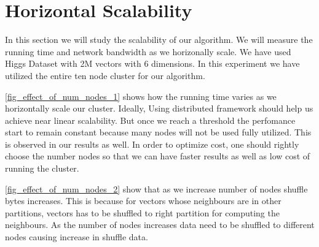 \section{Horizontal Scalability}
In this section we will study the scalability of our algorithm. We
will measure the running time and network bandwidth as we horizonally
scale.
We have used Higgs Dataset with 2M vectors with 6 dimensions. In this experiment we
have utilized the entire ten node cluster for our
algorithm.

\cref{fig_effect_of_num_nodes_1} shows how
the running time varies as we horizontally scale our cluster. Ideally,
Using distributed framework should help us achieve near linear
scalability. But once we reach a threshold the perfomance start to
remain constant because many nodes will not be used fully
utilized. This is observed in our results as well. In order to
optimize cost, one should rightly choose the number nodes so that we can have
faster results as well as low cost of running the cluster.

\cref{fig_effect_of_num_nodes_2} show that as we increase number of
nodes shuffle bytes increases. This is because for vectors whose
neighbours are in other partitions, vectors has to be shuffled to
right partition for computing the neighbours. As the number of nodes
increases data need to be shuffled to different nodes causing increase
in shuffle data.

